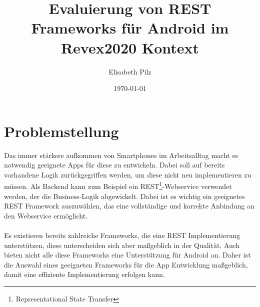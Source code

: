 \documentclass[a4paper,11pt,german,public]{INSOexpose}
\title{\centering Evaluierung von REST Frameworks für Android im Revex2020 Kontext \\}
\author{Elisabeth Pilz}
\date{\today}
\begin{document}
\maketitle
{}
\section{Problemstellung}

Das immer stärkere aufkommen von Smartphones im Arbeitsalltag macht es notwendig geeignete Apps für diese zu entwickeln. Dabei soll auf bereits vorhandene Logik zurückgegriffen werden, um diese nicht neu implementieren zu müssen. Als Backend kann zum Beispiel ein REST\footnote{Representational State Transfer}-Webservice verwendet werden, der die Business-Logik abgewickelt. Dabei ist es wichtig ein geeignetes REST Framework auszuwählen, das eine vollständige und korrekte Anbindung an den Webservice ermöglicht.   
\\\\
Es existieren bereits zahlreiche Frameworks, die eine REST Implementierung unterstützen, diese unterscheiden sich aber maßgeblich in der Qualität. Auch bieten nicht alle diese Frameworks eine Unterstützung für Android an. Daher ist die Auswahl eines geeigneten Frameworks für die App Entwicklung maßgeblich, damit eine effiziente Implementierung erfolgen kann. 


\end{document}
